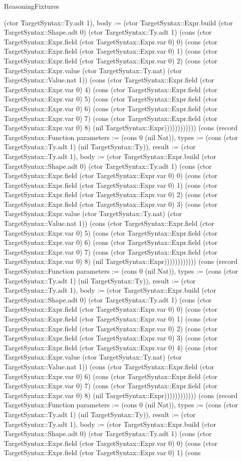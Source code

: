 \begin{lexlean}{ReasoningFixtures}
\begin{semanticmodule}
{(ctor TargetSyntax::Ty.adt 1), body := (ctor TargetSyntax::Expr.build (ctor TargetSyntax::Shape.adt 0) (ctor TargetSyntax::Ty.adt 1) (cons (ctor TargetSyntax::Expr.field (ctor TargetSyntax::Expr.var 0) 0) (cons (ctor TargetSyntax::Expr.field (ctor TargetSyntax::Expr.var 0) 1) (cons (ctor TargetSyntax::Expr.field (ctor TargetSyntax::Expr.var 0) 2) (cons (ctor TargetSyntax::Expr.value (ctor TargetSyntax::Ty.nat) (ctor TargetSyntax::Value.nat 1)) (cons (ctor TargetSyntax::Expr.field (ctor TargetSyntax::Expr.var 0) 4) (cons (ctor TargetSyntax::Expr.field (ctor TargetSyntax::Expr.var 0) 5) (cons (ctor TargetSyntax::Expr.field (ctor TargetSyntax::Expr.var 0) 6) (cons (ctor TargetSyntax::Expr.field (ctor TargetSyntax::Expr.var 0) 7) (cons (ctor TargetSyntax::Expr.field (ctor TargetSyntax::Expr.var 0) 8) (nil TargetSyntax::Expr)))))))))))}) (cons (record TargetSyntax::Function {parameters := (cons 0 (nil Nat)), types := (cons (ctor TargetSyntax::Ty.adt 1) (nil TargetSyntax::Ty)), result := (ctor TargetSyntax::Ty.adt 1), body := (ctor TargetSyntax::Expr.build (ctor TargetSyntax::Shape.adt 0) (ctor TargetSyntax::Ty.adt 1) (cons (ctor TargetSyntax::Expr.field (ctor TargetSyntax::Expr.var 0) 0) (cons (ctor TargetSyntax::Expr.field (ctor TargetSyntax::Expr.var 0) 1) (cons (ctor TargetSyntax::Expr.field (ctor TargetSyntax::Expr.var 0) 2) (cons (ctor TargetSyntax::Expr.field (ctor TargetSyntax::Expr.var 0) 3) (cons (ctor TargetSyntax::Expr.value (ctor TargetSyntax::Ty.nat) (ctor TargetSyntax::Value.nat 1)) (cons (ctor TargetSyntax::Expr.field (ctor TargetSyntax::Expr.var 0) 5) (cons (ctor TargetSyntax::Expr.field (ctor TargetSyntax::Expr.var 0) 6) (cons (ctor TargetSyntax::Expr.field (ctor TargetSyntax::Expr.var 0) 7) (cons (ctor TargetSyntax::Expr.field (ctor TargetSyntax::Expr.var 0) 8) (nil TargetSyntax::Expr)))))))))))}) (cons (record TargetSyntax::Function {parameters := (cons 0 (nil Nat)), types := (cons (ctor TargetSyntax::Ty.adt 1) (nil TargetSyntax::Ty)), result := (ctor TargetSyntax::Ty.adt 1), body := (ctor TargetSyntax::Expr.build (ctor TargetSyntax::Shape.adt 0) (ctor TargetSyntax::Ty.adt 1) (cons (ctor TargetSyntax::Expr.field (ctor TargetSyntax::Expr.var 0) 0) (cons (ctor TargetSyntax::Expr.field (ctor TargetSyntax::Expr.var 0) 1) (cons (ctor TargetSyntax::Expr.field (ctor TargetSyntax::Expr.var 0) 2) (cons (ctor TargetSyntax::Expr.field (ctor TargetSyntax::Expr.var 0) 3) (cons (ctor TargetSyntax::Expr.field (ctor TargetSyntax::Expr.var 0) 4) (cons (ctor TargetSyntax::Expr.value (ctor TargetSyntax::Ty.nat) (ctor TargetSyntax::Value.nat 1)) (cons (ctor TargetSyntax::Expr.field (ctor TargetSyntax::Expr.var 0) 6) (cons (ctor TargetSyntax::Expr.field (ctor TargetSyntax::Expr.var 0) 7) (cons (ctor TargetSyntax::Expr.field (ctor TargetSyntax::Expr.var 0) 8) (nil TargetSyntax::Expr)))))))))))}) (cons (record TargetSyntax::Function {parameters := (cons 0 (nil Nat)), types := (cons (ctor TargetSyntax::Ty.adt 1) (nil TargetSyntax::Ty)), result := (ctor TargetSyntax::Ty.adt 1), body := (ctor TargetSyntax::Expr.build (ctor TargetSyntax::Shape.adt 0) (ctor TargetSyntax::Ty.adt 1) (cons (ctor TargetSyntax::Expr.field (ctor TargetSyntax::Expr.var 0) 0) (cons (ctor TargetSyntax::Expr.field (ctor TargetSyntax::Expr.var 0) 1) (cons }
\end{semanticmodule}
\end{lexlean}
